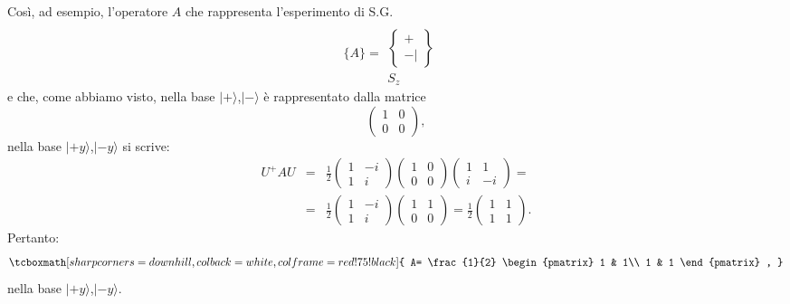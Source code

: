 \documentclass[a4paper,12pt,oneside]{book}
\begin{document}
Così, ad esempio, l'operatore $A$ che rappresenta l'esperimento di S.G.
	\begin{equation}
		\bigg\lbrace A\bigg\rbrace =
		\begin{matrix}
		\
		\\[0.25cm]
		\begin{Bmatrix}
		 +  \\ - |  
		\end{Bmatrix} \\[0.5cm]
		S_z&
		\end{matrix}
	\end{equation}
e che, come abbiamo visto, nella base $| + \rangle $,$| - \rangle $ è rappresentato dalla matrice
	\begin{equation}
		\begin{pmatrix}
		1 & 0\\
		0 & 0
		\end{pmatrix} ,
	\end{equation}
nella base $| +y \rangle $,$| -y \rangle$ si scrive:
	\begin{eqnarray}
		U^+AU &=& \frac{1}{2}
		\begin{pmatrix}
		1 & -i\\
		1 & i
		\end{pmatrix}
		\begin{pmatrix}
		1 & 0\\
		0 & 0
		\end{pmatrix}
		\begin{pmatrix}
		1 & 1\\
		i & -i
		\end{pmatrix}= \nonumber \\
		&=&\frac{1}{2}
		\begin{pmatrix}
		1 & -i\\
		1 & i
		\end{pmatrix}
		\begin{pmatrix}
		1 & 1\\
		0 & 0
		\end{pmatrix}=
		\frac{1}{2}
		\begin{pmatrix}
		1 & 1\\
		1 & 1
		\end{pmatrix} .
		\end{eqnarray}
Pertanto:
	\begin{equation}
		\tcboxmath[sharp corners=downhill ,colback=white,colframe=red!75!black]{
			A= \frac{1}{2}
			\begin{pmatrix}
			1 & 1\\
			1 & 1
			\end{pmatrix} ,
			}
	\end{equation}
nella base $| +y \rangle $,$| -y \rangle $.\\
\end{document}
